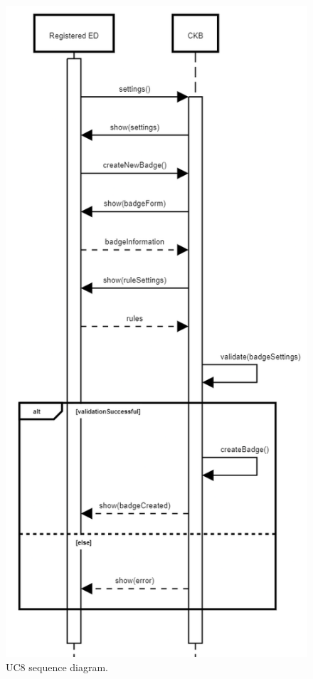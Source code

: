 \begin{center}
  \begin{figure} [H]
    \begin{center}
        \includegraphics[width=\textwidth,height=\textheight,keepaspectratio]{Images/SequenceDiagrams/UC8.png}
        \caption{UC8 sequence diagram.}
        \label{fig: UC8_sequence_diagram}
    \end{center}
  \end{figure}
\end{center}

